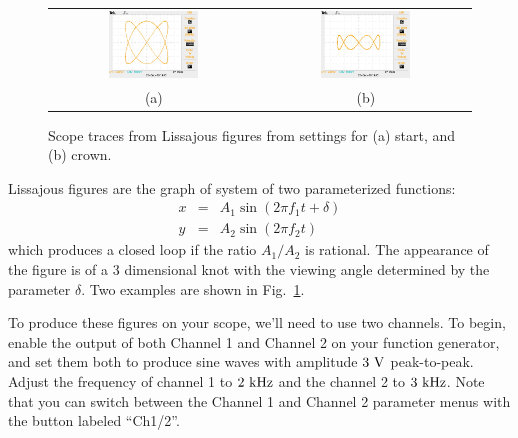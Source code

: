 \begin{figure}[htbp]
\begin{center}
\begin{tabular}{cc}
\includegraphics[width=0.45\textwidth]{figs/labs/lissajous/scope_lissajous.jpg} & 
\includegraphics[width=0.45\textwidth]{figs/labs/lissajous/scope_crown.jpg} \\
(a) & (b) \\
\end{tabular}
\caption{Scope traces from Lissajous figures from settings for (a) start, and (b) crown.}
\label{fig:tracelissajous}
\end{center}
\end{figure}
Lissajous figures are the graph of system of two parameterized functions:
\begin{eqnarray*}
x &=& A_1 \sin(2 \pi f_1 t + \delta) \\
y &=& A_2 \sin(2 \pi f_2 t) 
\end{eqnarray*}
which produces a closed loop if the ratio $A_1 / A_2$ is rational.  The appearance of the figure is of a 3 dimensional knot with the viewing angle determined by the parameter $\delta$.  Two examples are shown in Fig.~\ref{fig:tracelissajous}.

To produce these figures on your scope, we'll need to use two
channels.  To begin, enable the output of both Channel 1 and Channel 2
on your function generator, and set them both to produce sine waves
with amplitude $3~\rm V$ peak-to-peak.  Adjust the frequency of
channel 1 to $2~\rm kHz$ and the channel 2 to $3~\rm kHz$.  Note that
you can switch between the Channel 1 and Channel 2 parameter menus
with the button labeled ``Ch1/2''.

